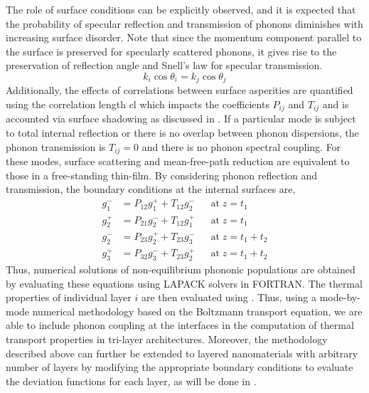 The role of surface conditions can be explicitly observed, and it is expected that the probability of specular reflection and transmission of phonons diminishes with increasing surface disorder. Note that since the momentum component parallel to the surface is preserved for specularly scattered phonons, it gives rise to the preservation of reflection angle and Snell’s law for specular transmission.
\begin{equation}
k_{i}\cos\theta_{i} = k_{j}\cos\theta_{j}
\label{eq:snells_law}
\end{equation} 
Additionally, the effects of correlations between surface asperities are quantified using the correlation length \gls{cl} which impacts the coefficients $P_{ij}$ and $T_{ij}$ and is accounted via surface shadowing as discussed in . If a particular mode is subject to total internal reflection or there is no overlap between phonon dispersions, the phonon transmission is $T_{ij} = 0$ and there is no phonon spectral coupling. For these modes, surface scattering and mean-free-path reduction are equivalent to those in a free-standing thin-film. By considering phonon reflection and transmission, the boundary conditions at the internal surfaces are,
\begin{equation}\label{BM2}
\begin{aligned}
 g_1^- &= P_{12}g_1^+ + T_{12}g_2^- && \text{at}\; z=t_1\\
 g_2^+ &= P_{21}g_2^- + T_{12}g_1^+ && \text{at}\; z=t_1\\
 g_2^- &= P_{23}g_2^+ + T_{23}g_3^- && \text{at}\; z=t_1+t_2\\
 g_3^+ &= P_{32}g_3^- + T_{23}g_2^+ && \text{at}\; z=t_1+t_2
\end{aligned}
\end{equation}
Thus, numerical solutions of non-equilibrium phononic populations are obtained by evaluating these equations using LAPACK solvers in FORTRAN. The thermal properties of individual layer $i$ are then evaluated using . Thus, using a mode-by-mode numerical methodology based on the Boltzmann transport equation, we are able to include phonon coupling at the interfaces in the computation of thermal transport properties in tri-layer architectures. Moreover, the methodology described above can further be extended to layered nanomaterials with arbitrary number of layers by modifying the appropriate boundary conditions to evaluate the deviation functions for each layer, as will be done in .
